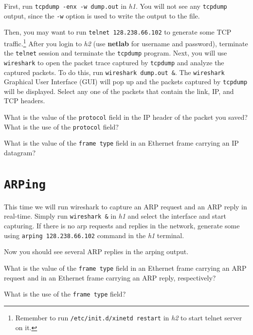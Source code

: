 \documentclass{../UTNetLab}
\begin{document}
    First, run \lstinline{tcpdump -enx -w dump.out} in \textit{h1}.
    You will not see any \lstinline{tcpdump} output, since the \lstinline{-w} option is used to write the output to the  file.

    Then, you may want to run \lstinline{telnet 128.238.66.102} to generate some TCP traffic.\footnote{Remember to run \lstinline{/etc/init.d/xinetd restart} in \textit{h2} to start telnet server on it.}
    After you login to \textit{h2} (use \textbf{netlab} for username and password), terminate the \lstinline{telnet} session and terminate the \lstinline{tcpdump} program.
    Next, you will use \lstinline{wireshark} to open the packet trace captured by \lstinline{tcpdump} and analyze the captured packets.
    To do this, run \lstinline{wireshark dump.out &}.
    The \lstinline{wireshark} Graphical User Interface (GUI) will pop up and the packets captured by \lstinline{tcpdump} will be displayed.
    Select any one of the packets that contain the link, IP, and TCP headers.
    
    \begin{report}
    \item What is the value of the \texttt{protocol} field in the IP header of the packet you saved?
    What is the use of the \texttt{protocol} field?

    \item What is the value of the \texttt{frame type} field in an Ethernet frame carrying an IP datagram?
    \end{report}

\section{\texttt{ARPing}}
    This time we will run wireshark to capture an ARP request and an ARP reply in real-time. Simply run \lstinline{wireshark &} in \textit{h1} and select the interface and start capturing.
    If there is no arp requests and replies in the network, generate some using \lstinline{arping 128.238.66.102} command in the \textit{h1} terminal.

    Now you should see several ARP replies in the arping output.
    
    \begin{report}
    \item What is the value of the \texttt{frame type} field in an Ethernet frame carrying an ARP request and in an Ethernet frame carrying an ARP reply, respectively?

    \item What is the use of the \texttt{frame type} field?
    \end{report}
\end{document}
